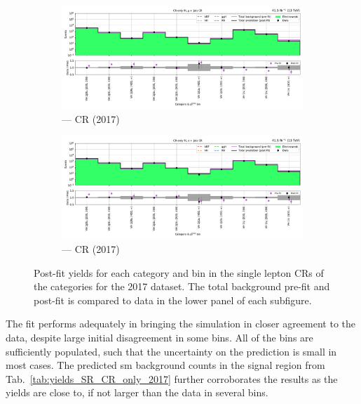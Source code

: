 \begin{figure}[htbp]
    \centering
    \begin{subfigure}[b]{\textwidth}
        \includegraphics[width=\textwidth]{chapters/higgstoinv/figures/mountain_ranges/2017/VH/Wmunu_tree_fit_b-abs_values_VH_cats.pdf}
        \caption{\VH --- \singleMuCr \gls{CR} (2017)}
    \end{subfigure}
    \hfill
    \begin{subfigure}[b]{\textwidth}
        \includegraphics[width=\textwidth]{chapters/higgstoinv/figures/mountain_ranges/2017/VH/Wenu_tree_fit_b-abs_values_VH_cats.pdf}
        \caption{\VH --- \singleEleCr \gls{CR} (2017)}
    \end{subfigure}
    \caption[Post-fit yields for each category and \ptmiss bin in the single lepton control regions of the \VH categories for the 2017 dataset]{Post-fit yields for each category and \ptmiss bin in the single lepton \glspl{CR} of the \VH categories for the 2017 dataset. The total background pre-fit and post-fit is compared to data in the lower panel of each subfigure.}
    \label{fig:htoinv_mountain_range_2017_single_lep_VH}
\end{figure}

The fit performs adequately in bringing the simulation in closer agreement to the data, despite large initial disagreement in some bins. All of the bins are sufficiently populated, such that the uncertainty on the prediction is small in most cases. The predicted \acrshort{sm} background counts in the signal region from Tab.~\ref{tab:yields_SR_CR_only_2017} further corroborates the results as the yields are close to, if not larger than the data in several bins.


